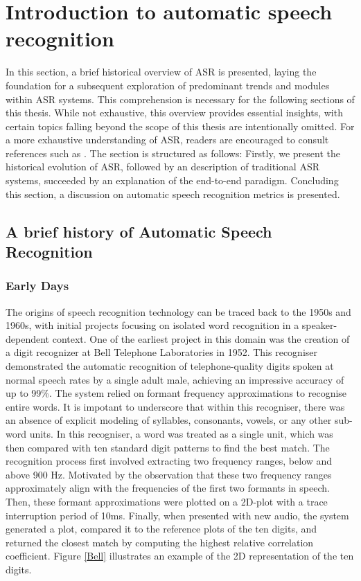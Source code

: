 \section{Introduction to automatic speech recognition}%
In this section, a brief historical overview of \ac{ASR} is presented, laying the foundation for a subsequent exploration of predominant trends and modules within \ac{ASR} systems. This comprehension is necessary for the following sections of this thesis. While not exhaustive, this overview provides essential insights, with certain topics falling beyond the scope of this thesis are intentionally omitted. For a more exhaustive understanding of \ac{ASR}, readers are encouraged to consult references such as \cite{benzeghiba2007automatic, karpagavalli2016review, arora2012automatic}. The section is structured as follows: Firstly, we present the historical evolution of \ac{ASR}, followed by an description of traditional \ac{ASR} systems, succeeded by an explanation of the end-to-end paradigm. Concluding this section, a discussion on automatic speech recognition metrics is presented.

\subsection{A brief history of Automatic Speech Recognition}

\subsubsection{Early Days}

The origins of speech recognition technology can be traced back to the 1950s and 1960s, with initial projects focusing on isolated word recognition in a speaker-dependent context. One of the earliest project in this domain was the creation of a digit recognizer at Bell Telephone Laboratories in 1952. This recogniser demonstrated the automatic recognition of telephone-quality digits spoken at normal speech rates by a single adult male, achieving an impressive accuracy of up to 99\%. The system relied on formant frequency approximations to recognise entire words. It is impotant to underscore that within this recogniser, there was an absence of explicit modeling of syllables, consonants, vowels, or any other sub-word units. In this recogniser, a word was treated as a single unit, which was then compared with ten standard digit patterns to find the best match. The recognition process first involved extracting two frequency ranges, below and above 900 \ac{Hz}. Motivated by the observation that these two frequency ranges approximately align with the frequencies of the first two formants in speech. Then, these formant approximations were plotted on a 2D-plot with a trace interruption period of 10ms. Finally, when presented with new audio, the system generated a plot, compared it to the reference plots of the ten digits, and returned the closest match by computing the highest relative correlation coefficient. Figure \ref{Bell} illustrates an example of the 2D representation of the ten digits.


